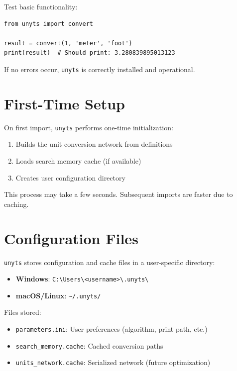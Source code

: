 \documentclass[11pt,a4paper]{report}
\begin{document}
Test basic functionality:

\begin{lstlisting}[style=pythonstyle]
from unyts import convert

result = convert(1, 'meter', 'foot')
print(result)  # Should print: 3.280839895013123
\end{lstlisting}

If no errors occur, \texttt{unyts} is correctly installed and operational.

\section{First-Time Setup}

On first import, \texttt{unyts} performs one-time initialization:
\begin{enumerate}[leftmargin=*]
  \item Builds the unit conversion network from definitions
  \item Loads search memory cache (if available)
  \item Creates user configuration directory
\end{enumerate}

This process may take a few seconds. Subsequent imports are faster due to caching.

\section{Configuration Files}

\texttt{unyts} stores configuration and cache files in a user-specific directory:
\begin{itemize}[leftmargin=*]
  \item \textbf{Windows}: \texttt{C:\textbackslash Users\textbackslash<username>\textbackslash .unyts\textbackslash}
  \item \textbf{macOS/Linux}: \texttt{\textasciitilde/.unyts/}
\end{itemize}

Files stored:
\begin{itemize}[leftmargin=*]
  \item \texttt{parameters.ini}: User preferences (algorithm, print path, etc.)
  \item \texttt{search\_memory.cache}: Cached conversion paths
  \item \texttt{units\_network.cache}: Serialized network (future optimization)
\end{itemize}
\end{document}
